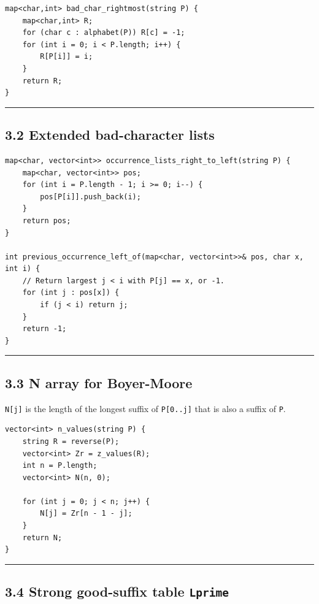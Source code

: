 \documentclass[11pt]{article}
\begin{document}
\begin{verbatim}
map<char,int> bad_char_rightmost(string P) {
    map<char,int> R;
    for (char c : alphabet(P)) R[c] = -1;
    for (int i = 0; i < P.length; i++) {
        R[P[i]] = i;
    }
    return R;
}
\end{verbatim}

\begin{center}\rule{0.5\linewidth}{0.5pt}\end{center}

\subsection{3.2 Extended bad-character lists}\label{extended-bad-character-lists}

\begin{verbatim}
map<char, vector<int>> occurrence_lists_right_to_left(string P) {
    map<char, vector<int>> pos;
    for (int i = P.length - 1; i >= 0; i--) {
        pos[P[i]].push_back(i);
    }
    return pos;
}

int previous_occurrence_left_of(map<char, vector<int>>& pos, char x, int i) {
    // Return largest j < i with P[j] == x, or -1.
    for (int j : pos[x]) {
        if (j < i) return j;
    }
    return -1;
}
\end{verbatim}

\begin{center}\rule{0.5\linewidth}{0.5pt}\end{center}

\subsection{3.3 N array for Boyer-Moore}\label{n-array-for-boyer-moore}

\texttt{N[j]} is the length of the longest suffix of \texttt{P[0..j]} that is also a suffix of \texttt{P}.

\begin{verbatim}
vector<int> n_values(string P) {
    string R = reverse(P);
    vector<int> Zr = z_values(R);
    int n = P.length;
    vector<int> N(n, 0);

    for (int j = 0; j < n; j++) {
        N[j] = Zr[n - 1 - j];
    }
    return N;
}
\end{verbatim}

\begin{center}\rule{0.5\linewidth}{0.5pt}\end{center}

\subsection{\texorpdfstring{3.4 Strong good-suffix table \texttt{Lprime}}{3.4 Strong good-suffix table Lprime}}\label{strong-good-suffix-table-lprime}
\end{document}
